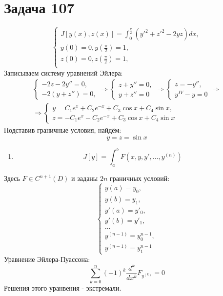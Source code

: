 \documentclass[11pt]{article}
\begin{document}
\section{Задача 107}
\label{sec:org59fac52}
\begin{equation*}
\begin{cases}
J[y(x), z(x)] = \int_0^{\frac{\pi}2}(y'^2 + z'^2 - 2yz)dx, \\
y(0) = 0, y\left(\frac{\pi}2\right) = 1, \\
z(0) = 0, z\left(\frac{\pi}2\right) = 1, \\
\end{cases}
\end{equation*}
Записываем систему уравнений Эйлера:
\begin{multline*}
\begin{cases}
-2z - 2y'' = 0, \\
-2(y + z'') = 0,
\end{cases}
\Rightarrow
\begin{cases}
z + y'' = 0, \\
y + z'' = 0
\end{cases}
\Rightarrow
\begin{cases}
z = -y'', \\
y^{IV} - y = 0
\end{cases}
\Rightarrow \\
\Rightarrow
\begin{cases}
y = C_1e^x + C_2e^{-x} + C_3\cos x + C_4\sin x, \\
z = -C_1e^x - C_2e^{-x} + C_3\cos x + C_4\sin x
\end{cases}
\end{multline*}
Подставив граничные условия, найдём:
\begin{equation*}
y = z = \sin x
\end{equation*}
\begin{enumerate}
\item $$J[y] = \int_a^bF(x, y, y', \ldots, y^{(n)})$$
\end{enumerate}
Здесь \(F \in C^{n + 1}(D)\) и заданы \(2n\) граничных условий:
\begin{equation*}
\begin{cases}
y(a) = y_0, \\
y(b) = y_1, \\
y'(a) = y'_0, \\
y'(b) = y'_1, \\
\ldots \\
y^{(n - 1)} = y_0^{n - 1}, \\
y^{(n - 1)} = y_1^{n - 1}
\end{cases}
\end{equation*}
Уравнение Эйлера-Пуассона:
$$\sum_{k = 0}^n(-1)^k\frac{d^k}{dx^k}F_{y^{(k)}} = 0$$
Решения этого уранвения - экстремали.
\end{document}
